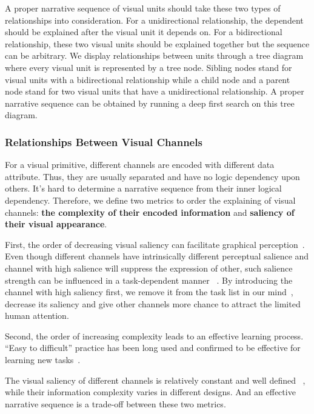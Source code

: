 A proper narrative sequence of visual units should take these two types of relationships into consideration. For a unidirectional relationship, the dependent should be explained after the visual unit it depends on. For a bidirectional relationship, these two visual units should be explained together but the sequence can be arbitrary. 
We display relationships between units through a tree diagram where every visual unit is represented by a tree node. Sibling nodes stand for visual units with a bidirectional relationship while a child node and a parent node stand for two visual units that have a unidirectional relationship. A proper narrative sequence can be obtained by running a deep first search on this tree diagram. 



\subsubsection{Relationships Between Visual Channels}
For a visual primitive, different channels are encoded with different data attribute. Thus, they are usually separated and have no logic dependency upon others. It's hard to determine a narrative sequence from their inner logical dependency. 
Therefore, we define two metrics to order the explaining of visual channels: \textbf{the complexity of their encoded information} and \textbf{saliency of their visual appearance}.

First, the order of decreasing visual saliency can facilitate graphical perception~\cite{cleveland_graphical_1984}. Even though different channels have intrinsically different perceptual salience and channel with high salience will suppress the expression of other, such salience strength can be influenced in a task-dependent manner ~\cite{nothdurft_salience_2000}. By introducing the channel with high saliency first, we remove it from the task list in our mind~\cite{itti2001computational}, decrease its saliency and give other channels more chance to attract the limited human attention. 

Second, the order of increasing complexity leads to an effective learning process. “Easy to difficult” practice has been long used and confirmed to be effective for learning new tasks~\cite{bliss_effects_1992}.
 
The visual saliency of different channels is relatively constant and  well defined ~\cite{munzner_visualization_2014,cleveland_graphical_1984}, while their information complexity varies in different designs. And an effective narrative sequence is a trade-off between these two metrics. 

